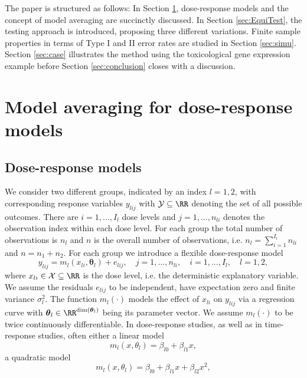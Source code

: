 {The paper is structured as follows: 
In Section \ref{sec:MA}, dose-response models and the concept of model averaging are succinctly discussed. 
In Section \ref{sec:EquiTest}, the testing approach is introduced, proposing three different variations. Finite sample properties in terms of Type I and II error rates are studied in Section \ref{sec:simu}.
Section \ref{sec:case} illustrates the method using the toxicological gene expression example before Section \ref{sec:conclusion} closes with a discussion. 


\section{Model averaging for dose-response models} \label{sec:MA}
\subsection{Dose-response models} \label{sec:MA:regression}
We consider two different groups, indicated by an index $l = 1, 2$, with corresponding response variables $y_{lij}$ 
with $\mathcal{Y} \subseteq \RR$ denoting the set of all possible outcomes. There are $i = 1, ..., I_l$ dose levels and $j = 1, ..., n_{li}$ denotes the observation index within each dose level. For each group the total number of observations is $n_l$ and $n$ is the overall number of observations, i.e. $n_l = \sum_{i=1}^{I_l} n_{li}$ and $n=n_1 + n_2$.
For each group we introduce a flexible dose-response model  
$$y_{lij}=m_l(x_{li}, \boldsymbol{\theta}_{l}) + e_{lij}, \quad j = 1, ..., n_{li}, \quad i = 1, ..., I_l, \quad l=1,2,$$
where $x_{li} \in \mathcal{X} \subseteq \RR$ is the dose level, i.e. the deterministic explanatory variable. We assume the 
residuals $e_{lij}$ to be independent, have expectation zero and finite variance $\sigma^2_l$.
The function $m_l(\cdot)$ models the effect of $x_{li}$ on $y_{lij}$ via a regression curve with $\boldsymbol{\theta}_{l} \in \RR^{\dim(\boldsymbol{\theta}_{l})}$ being its parameter vector. 
We assume $m_{l}(\cdot)$ to be twice continuously differentiable.
In dose-response studies, as well as in time-response studies, often either a linear model
\begin{equation} \label{eq:linear}
    m_l(x, \theta_l) = \beta_{l0} + \beta_{l1} x,
\end{equation}
a quadratic model
\begin{equation} \label{eq:quadratic}
    m_l(x, \theta_l) = \beta_{l0} + \beta_{l1} x + \beta_{l2} x^2,
\end{equation}
}

